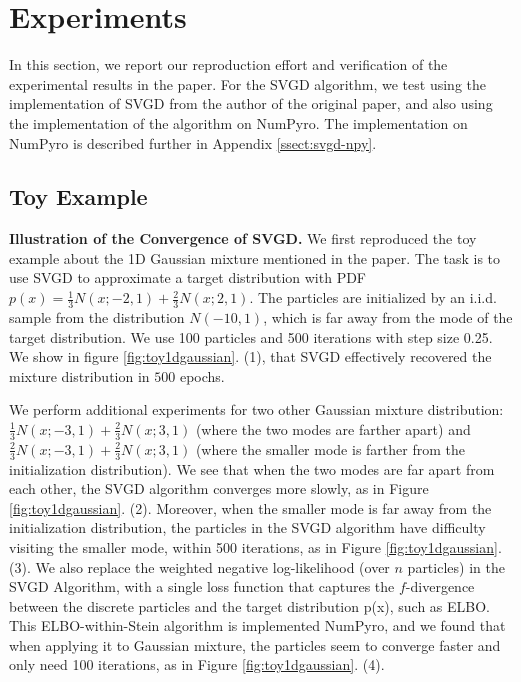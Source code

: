 \section{Experiments}
In this section, we report our reproduction effort and verification of the experimental results in the paper. For the SVGD algorithm, we test using the implementation of SVGD from the author of the original paper, and also using the implementation of the algorithm on NumPyro. The implementation on NumPyro is described further in Appendix \ref{ssect:svgd-npy}.

\subsection{Toy Example}


\noindent\textbf{Illustration of the Convergence of SVGD.} We first reproduced the toy example about the 1D Gaussian mixture mentioned in the paper. The task is to use SVGD to approximate a target distribution with PDF $p(x) = \frac{1}{3} N(x; -2, 1) + \frac{2}{3} N(x; 2, 1)$. The particles are initialized by an i.i.d. sample from the distribution $N(-10, 1)$, which is far away from the mode of the target distribution. We use 100 particles and 500 iterations with step size 0.25. We show in figure \ref{fig:toy1dgaussian}. (1), that SVGD effectively recovered the mixture distribution in $500$ epochs.

We perform additional experiments for two other Gaussian mixture distribution: $\frac{1}{3} N(x; -3, 1) + \frac{2}{3} N(x; 3, 1)$ (where the two modes are farther apart) and $\frac{2}{3} N(x; -3, 1) + \frac{2}{3} N(x; 3, 1)$ (where the smaller mode is farther from the initialization distribution). We see that when the two modes are far apart from each other, the SVGD algorithm converges more slowly, as in Figure  \ref{fig:toy1dgaussian}. (2). Moreover, when the smaller mode is far away from the initialization distribution, the particles in the SVGD algorithm have difficulty visiting the smaller mode, within 500 iterations, as in Figure  \ref{fig:toy1dgaussian}. (3). We also replace the weighted negative log-likelihood (over $n$ particles) in the SVGD Algorithm, with a single loss function that captures the $f$-divergence between the discrete particles and the target distribution p(x), such as ELBO. This ELBO-within-Stein algorithm is implemented NumPyro, and we found that when applying it to Gaussian mixture, the particles seem to converge faster and only need 100 iterations, as in Figure  \ref{fig:toy1dgaussian}. (4).

